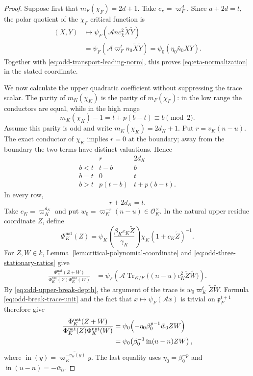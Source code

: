 \documentclass[11pt]{amsart}
\theoremstyle{definition}
\theoremstyle{remark}
\newcommand{\cO}{\mathcal O}
\newcommand{\p}{\mathfrak p}
\newcommand{\Tr}{\operatorname{Tr}}
\begin{document}
\begin{proof}
Suppose first that $m_F(\chi_F)=2d+1$.  Take
$c_\chi=\varpi_F^d$.  Since $a+2d=t$, the polar quotient of the
$\chi_F$ critical function is
\begin{align*}
 (X,Y)&\longmapsto
 \psi_F(\mathcal A n c_\chi^2\widetilde X\widetilde Y)\\
 &=\psi_F(\mathcal A\varpi_F^t n_0
                 \widetilde X\widetilde Y)
 =\psi_0(\eta_0\bar n_0XY).
\end{align*}
Together with \eqref{eq:odd-transport-leading-norm}, this proves
\eqref{eq:eta-normalization} in the stated coordinate.

We now calculate the upper quadratic coefficient without suppressing
the trace scalar.  The parity of $m_K(\chi_K)$ is the parity of
$m_F(\chi_F)$: in the low range the conductors are equal, while in the
high range
\[
 m_K(\chi_K)-1=t+p(b-t)\equiv b\pmod2.
\]
Assume this parity is odd and write $m_K(\chi_K)=2d_K+1$.  Put
$r=v_K(n-u)$.  The exact conductor of $\chi_K$ implies $r=0$ at the
boundary; away from the boundary the two terms have distinct
valuations.  Hence
\begin{equation}\label{eq:odd-upper-depth-table}
 \begin{array}{c|c|c}
  &r&2d_K\\ \hline
  b<t&t-b&b\\
  b=t&0&t\\
  b>t&p(t-b)&t+p(b-t).
 \end{array}
\end{equation}
In every row,
\begin{equation}\label{eq:odd-upper-break-depth}
 r+2d_K=t.
\end{equation}
Take $c_K=\varpi_K^{d_K}$ and put
$w_0=\varpi_K^{-r}(n-u)\in\cO_K^\times$.  In the natural upper
residue coordinate $Z$, define
\[
 \Phi_K^{\mathrm{nat}}(Z)=
 \psi_K\!\left(\frac{\beta_Kc_K\widetilde Z}{\gamma_K}\right)
 \chi_K(1+c_K\widetilde Z)^{-1}.
\]
For $Z,W\in k$, Lemma~\ref{lem:critical-polynomial-coordinate} and
\eqref{eq:odd-three-stationary-ratios} give
\begin{align*}
 \frac{\Phi_K^{\mathrm{nat}}(Z+W)}
      {\Phi_K^{\mathrm{nat}}(Z)\Phi_K^{\mathrm{nat}}(W)}
 &=\psi_F\!\left(
   \mathcal A\Tr_{K/F}\bigl((n-u)c_K^2
                  \widetilde Z\widetilde W\bigr)\right).
\end{align*}
By \eqref{eq:odd-upper-break-depth}, the argument of the trace is
$w_0\varpi_K^t\widetilde Z\widetilde W$.  Formula
\eqref{eq:odd-break-trace-unit} and the fact that
$x\mapsto\psi_F(\mathcal A x)$ is trivial on $\p_F^{t+1}$ therefore
give
\begin{align}
 \frac{\Phi_K^{\mathrm{nat}}(Z+W)}
      {\Phi_K^{\mathrm{nat}}(Z)\Phi_K^{\mathrm{nat}}(W)}
 &=\psi_0\!\left(
   -\eta_0\beta_0^{p-1}\bar w_0ZW\right)\notag\\
 &=\psi_0\!\left(
   \beta_0^{-1}\operatorname{in}(u-n)ZW\right),
 \label{eq:odd-upper-natural-polar}
\end{align}
where
$\operatorname{in}(y)=\overline{\varpi_K^{-v_K(y)}y}$.
The last equality uses $\eta_0=\beta_0^{-p}$ and
$\operatorname{in}(u-n)=-\bar w_0$.


\end{proof}
\end{document}
